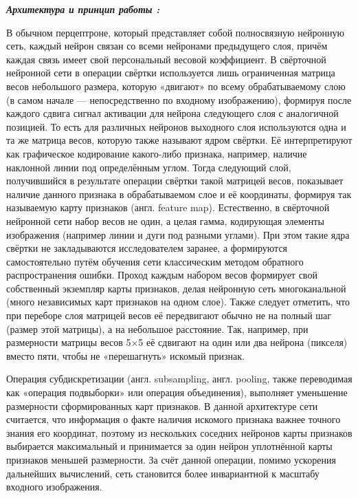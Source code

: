 \documentclass{article}
\begin{document}
\textbf{\textit{Архитектура и принцип работы :}} 

В обычном перцептроне, который представляет собой полносвязную нейронную сеть, каждый нейрон связан со всеми нейронами предыдущего слоя, причём каждая связь имеет свой персональный весовой коэффициент. В свёрточной нейронной сети в операции свёртки используется лишь ограниченная матрица весов небольшого размера, которую «двигают» по всему обрабатываемому слою (в самом начале — непосредственно по входному изображению), формируя после каждого сдвига сигнал активации для нейрона следующего слоя с аналогичной позицией. То есть для различных нейронов выходного слоя используются одна и та же матрица весов, которую также называют ядром свёртки. Её интерпретируют как графическое кодирование какого-либо признака, например, наличие наклонной линии под определённым углом. Тогда следующий слой, получившийся в результате операции свёртки такой матрицей весов, показывает наличие данного признака в обрабатываемом слое и её координаты, формируя так называемую карту признаков (англ. feature map). Естественно, в свёрточной нейронной сети набор весов не один, а целая гамма, кодирующая элементы изображения (например линии и дуги под разными углами). При этом такие ядра свёртки не закладываются исследователем заранее, а формируются самостоятельно путём обучения сети классическим методом обратного распространения ошибки. Проход каждым набором весов формирует свой собственный экземпляр карты признаков, делая нейронную сеть многоканальной (много независимых карт признаков на одном слое). Также следует отметить, что при переборе слоя матрицей весов её передвигают обычно не на полный шаг (размер этой матрицы), а на небольшое расстояние. Так, например, при размерности матрицы весов 5×5 её сдвигают на один или два нейрона (пикселя) вместо пяти, чтобы не «перешагнуть» искомый признак.

Операция субдискретизации (англ. subsampling, англ. pooling, также переводимая как «операция подвыборки» или операция объединения), выполняет уменьшение размерности сформированных карт признаков. В данной архитектуре сети считается, что информация о факте наличия искомого признака важнее точного знания его координат, поэтому из нескольких соседних нейронов карты признаков выбирается максимальный и принимается за один нейрон уплотнённой карты признаков меньшей размерности. За счёт данной операции, помимо ускорения дальнейших вычислений, сеть становится более инвариантной к масштабу входного изображения.
\end{document}
